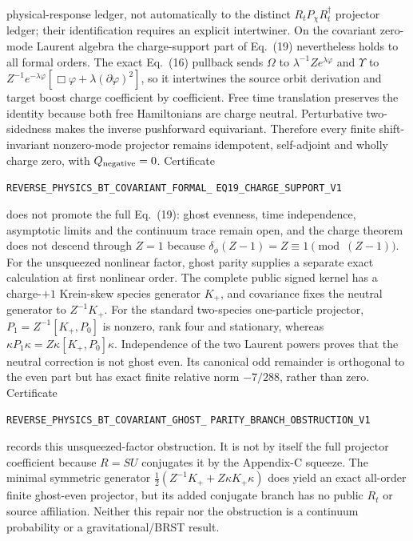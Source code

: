 \documentclass[11pt]{article}
\theoremstyle{definition}
\theoremstyle{remark}
\begin{document}
physical-response ledger, not automatically to the distinct
$R_tP_\chi R_t^\dagger$ projector ledger; their identification requires an
explicit intertwiner.
On the covariant zero-mode Laurent algebra the charge-support part of
Eq.~(19) nevertheless holds to all formal orders.  The exact Eq.~(16)
pullback sends $\Omega$ to
$\lambda^{-1}Ze^{\lambda\varphi}$ and $\Upsilon$ to
$Z^{-1}e^{-\lambda\varphi}
[\Box\varphi+\lambda(\partial\varphi)^2]$, so it intertwines the source
orbit derivation and target boost charge coefficient by coefficient.  Free
time translation preserves the identity because both free Hamiltonians
are charge neutral.  Perturbative
two-sidedness makes the inverse pushforward equivariant.  Therefore every
finite shift-invariant nonzero-mode projector remains idempotent,
self-adjoint and wholly charge zero, with $Q_{\rm negative}=0$.  Certificate
\par\noindent
\texttt{REVERSE\_PHYSICS\_BT\_COVARIANT\_FORMAL\_}
\allowbreak\texttt{EQ19\_CHARGE\_SUPPORT\_V1}
\par\noindent
does not promote the full Eq.~(19): ghost evenness, time independence,
asymptotic limits and the continuum trace remain open, and the charge theorem
does not descend through $Z=1$ because
$\delta_\phi(Z-1)=Z\equiv1\pmod{(Z-1)}$.
For the unsqueezed nonlinear factor, ghost parity supplies a separate exact
calculation at first nonlinear order.  The complete public signed kernel has a charge-$+1$ Krein-skew
species generator $K_+$, and covariance fixes the neutral generator to
$Z^{-1}K_+$.  For the standard two-species one-particle projector,
$P_1=Z^{-1}[K_+,P_0]$ is nonzero, rank four and stationary, whereas
$\kappa P_1\kappa=Z\kappa[K_+,P_0]\kappa$.  Independence of the two Laurent
powers proves that the neutral correction is not ghost even.  Its canonical
odd remainder is orthogonal to the even part but has exact finite relative
norm $-7/288$, rather than zero.  Certificate
\par\noindent
\texttt{REVERSE\_PHYSICS\_BT\_COVARIANT\_GHOST\_}
\allowbreak\texttt{PARITY\_BRANCH\_OBSTRUCTION\_V1}
\par\noindent
records this unsqueezed-factor obstruction.  It is not by itself the full
projector coefficient because $R=S U$ conjugates it by the Appendix-C
squeeze.  The minimal symmetric generator
$\frac12(Z^{-1}K_++Z\kappa K_+\kappa)$ does yield an exact all-order finite
ghost-even projector, but its added conjugate branch has no public $R_t$ or
source affiliation.  Neither this repair nor the obstruction is a continuum
probability or a gravitational/BRST result.
\end{document}
